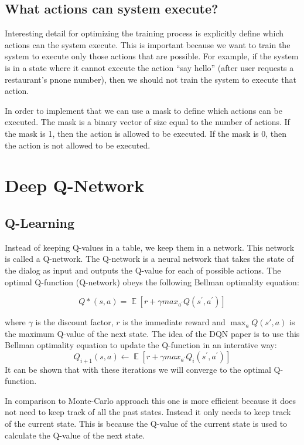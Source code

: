 \documentclass[12pt,titlepage,a4paper]{article}
\DeclareMathOperator*{\E}{\mathbb{E}}
\begin{document}
\subsection{What actions can system execute?}

Interesting detail for optimizing the training process is explicitly define which actions can the system execute. This is important because we want to train the system to execute only those actions that are possible. For example, if the system is in a state where it cannot execute the action “say hello” (after user requests a restaurant's pnone number), then we should not train the system to execute that action. 

In order to implement that we can use a mask to define which actions can be executed. The mask is a binary vector of size equal to the number of actions. If the mask is 1, then the action is allowed to be executed. If the mask is 0, then the action is not allowed to be executed.

\pagebreak


\section{Deep Q-Network}

\subsection{Q-Learning}
Instead of keeping Q-values in a table, we keep them in a network. This network is called a Q-network. The Q-network is a neural network that takes the state of the dialog as input and outputs the Q-value for each of possible actions. The optimal Q-function (Q-network) obeys the following Bellman optimality equation: 

\[ Q*(s,a) = \E [r + \gamma max_{a^\prime}Q(s^\prime,a^\prime)] \] 

where $\gamma$ is the discount factor,  $r$ is the immediate reward and $\max_a Q(s',a)$ is the maximum Q-value of the next state. The idea of the DQN paper is to use this Bellman optimality equation to update the Q-function in an interative way:
\[Q_{i + 1} (s,a) \leftarrow \E[r + \gamma max_{a^\prime}Q_{i}(s^\prime,a^\prime)]\]
It can be shown that with these iterations we will converge to the optimal Q-function.

In comparison to Monte-Carlo approach this one is more efficient because it does not need to keep track of all the past states. Instead it only needs to keep track of the current state. This is because the Q-value of the current state is used to calculate the Q-value of the next state.
\end{document}

